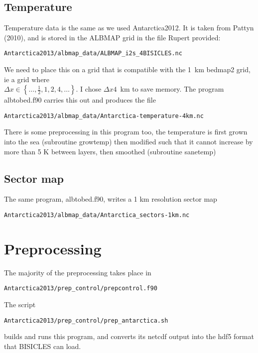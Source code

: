 \documentclass{article}
\begin{document}
\subsection{Temperature}

Temperature data is the same as we used Antarctica2012. It is taken from Pattyn (2010), and
is stored in the ALBMAP grid in the file Rupert provided:
\begin{verbatim}
Antarctica2013/albmap_data/ALBMAP_i2s_4BISICLES.nc
\end{verbatim}
We need to place this on a grid that is compatible with the 1~km bedmap2 grid, ie a 
grid where \\ $\Delta x \in \left \{ \ldots, \frac{1}{2}, 1, 2, 4,\ldots \right \}$. I chose 
$\Delta x 4$~km to save memory. The program
albtobed.f90 carries this out and produces the file
\begin{verbatim}
Antarctica2013/albmap_data/Antarctica-temperature-4km.nc
\end{verbatim}
There is some preprocessing in this program too, the temperature is first
grown into the sea (subroutine growtemp) then modified such that it cannot increase
by more than 5 K between layers, then smoothed (subroutine sanetemp)

\subsection{Sector map}

The same program, albtobed.f90, writes a 1 km resolution sector map 
\begin{verbatim}
Antarctica2013/albmap_data/Antarctica_sectors-1km.nc
\end{verbatim}

\section{\label{sec::preprocessing}Preprocessing}

The majority of the preprocessing takes place in
\begin{verbatim}
Antarctica2013/prep_control/prepcontrol.f90
\end{verbatim}
The script
\begin{verbatim}
Antarctica2013/prep_control/prep_antarctica.sh
\end{verbatim}
builds and runs this program, and converts its netcdf output into the hdf5 format that 
BISICLES can load.
\end{document}
